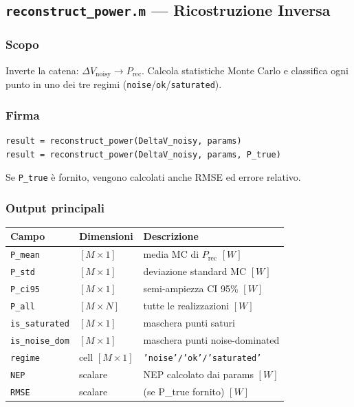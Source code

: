 \documentclass[11pt,a4paper]{article}
\begin{document}
\subsection{\texttt{reconstruct\_power.m} --- Ricostruzione Inversa}

\subsubsection*{Scopo}
Inverte la catena: $\Delta V_{\text{noisy}} \to P_{\text{rec}}$.
Calcola statistiche Monte Carlo e classifica ogni punto in uno dei
tre regimi (\texttt{noise}/\texttt{ok}/\texttt{saturated}).

\subsubsection*{Firma}
\begin{lstlisting}
result = reconstruct_power(DeltaV_noisy, params)
result = reconstruct_power(DeltaV_noisy, params, P_true)
\end{lstlisting}

Se \texttt{P\_true} è fornito, vengono calcolati anche RMSE ed errore relativo.

\subsubsection*{Output principali}

\begin{center}
\begin{tabular}{lll}
\toprule
Campo & Dimensioni & Descrizione \\
\midrule
\texttt{P\_mean}       & $[M \times 1]$ & media MC di $P_{\text{rec}}$ $[W]$ \\
\texttt{P\_std}        & $[M \times 1]$ & deviazione standard MC $[W]$ \\
\texttt{P\_ci95}       & $[M \times 1]$ & semi-ampiezza CI 95\% $[W]$ \\
\texttt{P\_all}        & $[M \times N]$ & tutte le realizzazioni $[W]$ \\
\texttt{is\_saturated} & $[M \times 1]$ & maschera punti saturi \\
\texttt{is\_noise\_dom}& $[M \times 1]$ & maschera punti noise-dominated \\
\texttt{regime}        & cell $[M\times1]$ & \texttt{'noise'/'ok'/'saturated'} \\
\texttt{NEP}           & scalare & NEP calcolato dai params $[W]$ \\
\texttt{RMSE}          & scalare & (se P\_true fornito) $[W]$ \\
\bottomrule
\end{tabular}
\end{center}
\end{document}
